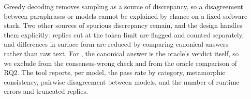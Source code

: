 Greedy decoding removes sampling as a source of discrepancy, so a disagreement between paraphrases or models cannot be explained by chance on a fixed software stack. Two other sources of spurious discrepancy remain, and the design handles them explicitly: replies cut at the token limit are flagged and counted separately, and differences in surface form are reduced by comparing canonical answers rather than raw text. For , the canonical answer is the oracle's verdict itself, so we exclude  from the consensus-wrong check and from the oracle comparison of RQ2. The tool reports, per model, the pass rate by category, metamorphic consistency, pairwise disagreement between models, and the number of runtime errors and truncated replies.
